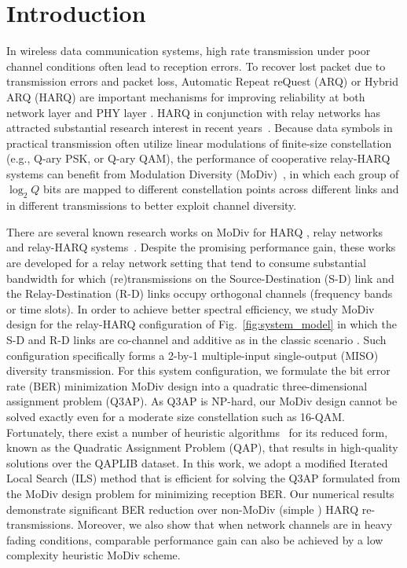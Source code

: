 \documentclass[journal,draftcls,onecolumn,12pt,twoside]{IEEEtran}
\begin{document}
\section{Introduction}
In wireless data communication systems, high rate transmission under poor
channel conditions often lead to reception errors. To recover lost packet due to
transmission errors and packet loss, Automatic Repeat
reQuest (ARQ) or Hybrid ARQ (HARQ) are important mechanisms for improving
reliability at both network layer \cite{TS36.331} and PHY layer \cite{TS36.213}.
HARQ in conjunction with relay networks has attracted substantial research
interest in recent years~\cite{ngo2014hybrid}. Because data symbols in practical
transmission often utilize linear modulations of finite-size
constellation (e.g., Q-ary PSK, or Q-ary QAM), the performance of cooperative relay-HARQ systems can benefit from Modulation Diversity
(MoDiv)~\cite{benelli1992new}, in which each group of $\log_2 Q$ bits are mapped
to different constellation points across different links and in different
transmissions to better exploit channel diversity.

There are several known research works on MoDiv for HARQ
\cite{harvind2005symbol}, relay networks~\cite{seddik2008trans,
khormuji2008rate} and relay-HARQ systems~\cite{kim2009design, ryu2011ber}.
Despite the promising performance gain, these works are developed for a relay
network setting that tend to consume substantial bandwidth for which
(re)transmissions on the Source-Destination (S-D) link and the Relay-Destination
(R-D) links occupy orthogonal channels (frequency bands or time slots). In order
to achieve better spectral efficiency, we study MoDiv design for the relay-HARQ
configuration of Fig.~\ref{fig:system_model} in which the S-D and R-D links are
co-channel and additive as in the classic scenario \cite{cover1979capacity,
nabar2004fading}. Such configuration specifically forms a 2-by-1
multiple-input single-output (MISO) diversity transmission.
For this system configuration, we formulate the bit error rate (BER)
minimization MoDiv design into a quadratic three-dimensional assignment problem (Q3AP). 
As Q3AP is NP-hard, our MoDiv design cannot be solved exactly 
even for a moderate size constellation such as 16-QAM. Fortunately, there exist
a number of heuristic algorithms~\cite{benlic2015memetic} for its reduced form,
known as the Quadratic Assignment Problem (QAP), that results in high-quality
solutions over the QAPLIB dataset. In this work, we adopt a modified Iterated
Local Search (ILS) method that is efficient for solving the Q3AP formulated from
the MoDiv design problem for minimizing reception BER. Our numerical results
demonstrate significant BER reduction over non-MoDiv (simple ) HARQ re-transmissions.
Moreover, we also show that when network channels are in heavy fading
conditions, comparable performance gain can also be achieved by a low complexity
heuristic MoDiv scheme.
\end{document}
